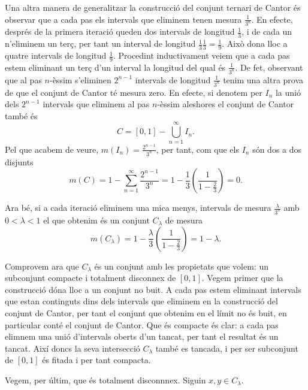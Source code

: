 \documentclass[12pt]{article}
\begin{document}
Una altra manera de generalitzar la construcció del conjunt ternari de Cantor és observar
que a cada pas els intervals que eliminem tenen mesura \( \frac{1}{3^n} \). En efecte,
després de la primera iteració queden dos intervals de longitud \( \frac{1}{3} \), i de
cada un n'eliminem un terç, per tant un interval de longitud \( \frac{1}{3}\frac{1}{3} =
\frac{1}{9} \). Això dona lloc a quatre intervals de longitud \( \frac{1}{9} \). Procedint
inductivament veiem que a cada pas estem eliminant un terç d'un interval la longitud del
qual és \( \frac{1}{3^n} \). De fet, observant que al pas \( n \)-èssim s'eliminen \(
2^{n-1} \) intervals de longitud \( \frac{1}{3^n} \) tenim una altra prova de que el
conjunt de Cantor té mesura zero. En efecte, si denotem per \( I_n \) la unió dels \(
2^{n-1} \) intervals que eliminem al pas \( n \)-èssim aleshores el conjunt de Cantor
també és
\begin{equation*}
	C = [0,1] - \bigcup_{n = 1}^{\infty} I_n.
\end{equation*}
Pel que acabem de veure, \( m(I_n) = \frac{2^{n-1}}{3^n} \), per tant, com que els \( I_n
\) són dos a dos disjunts
\begin{equation*}
	m(C) = 1 - \sum_{n = 1}^{\infty} \frac{2^{n-1}}{3^n} = 1 - \frac{1}{3}\left(\frac{1}{1 -
	\frac{2}{3}}\right) = 0. 
\end{equation*}

Ara bé, si a cada iteració eliminem una mica menys, intervals de mesura \(
\frac{\lambda}{3^n} \) amb \( 0 < \lambda < 1 \) el que obtenim és un conjunt \(
C_\lambda \) de mesura
\begin{equation*}
	m(C_\lambda) = 1 - \frac{\lambda}{3}\left(\frac{1}{1 - \frac{2}{3}}\right) = 1 -
	\lambda.
\end{equation*}

Comprovem ara que \( C_\lambda \) és un conjunt amb les propietats que volem: un
subconjunt compacte i totalment disconnex de \( [0,1] \). Vegem primer que la construcció
dóna lloc a un conjunt no buit. A cada pas estem eliminant intervals que estan continguts
dins dels intervals que eliminem en la construcció del conjunt de Cantor, per tant el
conjunt que obtenim en el límit no és buit, en particular conté el conjunt de Cantor. Que
és compacte és clar: a cada pas elimnem una unió d'intervals oberts d'un tancat, per tant
el resultat és un tancat. Així doncs la seva intersecció \( C_\lambda \) també es tancada,
i per ser subconjunt de \( [0,1] \) és fitada i per tant compacta. 

Vegem, per últim, que és totalment disconnnex. Siguin \( x, y \in C_\lambda \). 
\end{document}
